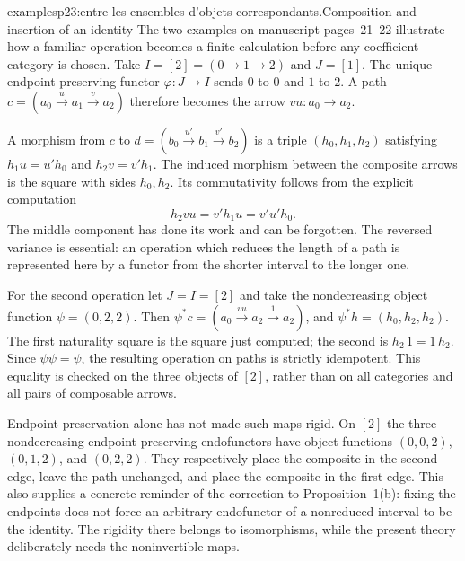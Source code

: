 \begin{dcomment}{examples}{p23:entre les ensembles d'objets correspondants.}{Composition and insertion of an identity}
The two examples on manuscript pages~21--22 illustrate how a familiar operation becomes a finite calculation before any coefficient category is chosen. Take $I=[2]=(0\to1\to2)$ and $J=[1]$. The unique endpoint-preserving functor $\varphi:J\to I$ sends $0$ to $0$ and $1$ to $2$. A path $c=(a_0\xrightarrow{u}a_1\xrightarrow{v}a_2)$ therefore becomes the arrow $vu:a_0\to a_2$.

A morphism from $c$ to $d=(b_0\xrightarrow{u'}b_1\xrightarrow{v'}b_2)$ is a triple $(h_0,h_1,h_2)$ satisfying $h_1u=u'h_0$ and $h_2v=v'h_1$. The induced morphism between the composite arrows is the square with sides $h_0,h_2$. Its commutativity follows from the explicit computation
\[
 h_2vu=v'h_1u=v'u'h_0.
\]
The middle component has done its work and can be forgotten. The reversed variance is essential: an operation which reduces the length of a path is represented here by a functor from the shorter interval to the longer one.

For the second operation let $J=I=[2]$ and take the nondecreasing object function $\psi=(0,2,2)$. Then $\psi^*c=(a_0\xrightarrow{vu}a_2\xrightarrow{1}a_2)$, and $\psi^*h=(h_0,h_2,h_2)$. The first naturality square is the square just computed; the second is $h_2\,1=1\,h_2$. Since $\psi\psi=\psi$, the resulting operation on paths is strictly idempotent. This equality is checked on the three objects of $[2]$, rather than on all categories and all pairs of composable arrows.

Endpoint preservation alone has not made such maps rigid. On $[2]$ the three nondecreasing endpoint-preserving endofunctors have object functions $(0,0,2)$, $(0,1,2)$, and $(0,2,2)$. They respectively place the composite in the second edge, leave the path unchanged, and place the composite in the first edge. This also supplies a concrete reminder of the correction to Proposition~1(b): fixing the endpoints does not force an arbitrary endofunctor of a nonreduced interval to be the identity. The rigidity there belongs to isomorphisms, while the present theory deliberately needs the noninvertible maps.
\end{dcomment}

